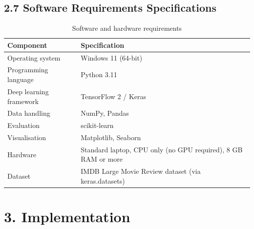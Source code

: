 \documentclass[12pt,a4paper,oneside]{report}
\begin{document}
\section*{2.7 Software Requirements Specifications}
\begin{table}[H]\centering\small
\caption{Software and hardware requirements}
\begin{tabularx}{\textwidth}{l>{\raggedright\arraybackslash}X}\toprule
\textbf{Component} & \textbf{Specification} \\\midrule
Operating system & Windows 11 (64-bit) \\
Programming language & Python 3.11 \\
Deep learning framework & TensorFlow 2 / Keras \\
Data handling & NumPy, Pandas \\
Evaluation & scikit-learn \\
Visualisation & Matplotlib, Seaborn \\
Hardware & Standard laptop, CPU only (no GPU required), 8 GB RAM or more \\
Dataset & IMDB Large Movie Review dataset (via keras.datasets) \\
\bottomrule\end{tabularx}\end{table}
\chapter*{3. Implementation}
\end{document}
